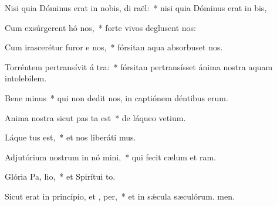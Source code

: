 \item Nisi quia Dóminus erat in nobis, di  raël:~* nisi quia Dóminus erat in bis,
\item Cum exsúrgerent hó  nos,~* forte vivos deglusent nos:
\item Cum irascerétur furor e  nos,~* fórsitan aqua absorbuset nos.
\item Torréntem pertransívit á tra:~* fórsitan pertransísset ánima nostra aquam intolebilem.
\item Bene minus~* qui non dedit nos, in captiónem déntibus erum.
\item Anima nostra sicut pas ta est~* de láqueo vetium.
\item Láque tus est,~* et nos liberáti mus.
\item Adjutórium nostrum in nó mini,~* qui fecit cælum et ram.
\item Glória Pa,  lio,~* et Spirítui to.
\item Sicut erat in princípio, et ,  per,~* et in sǽcula sæculórum. men.
